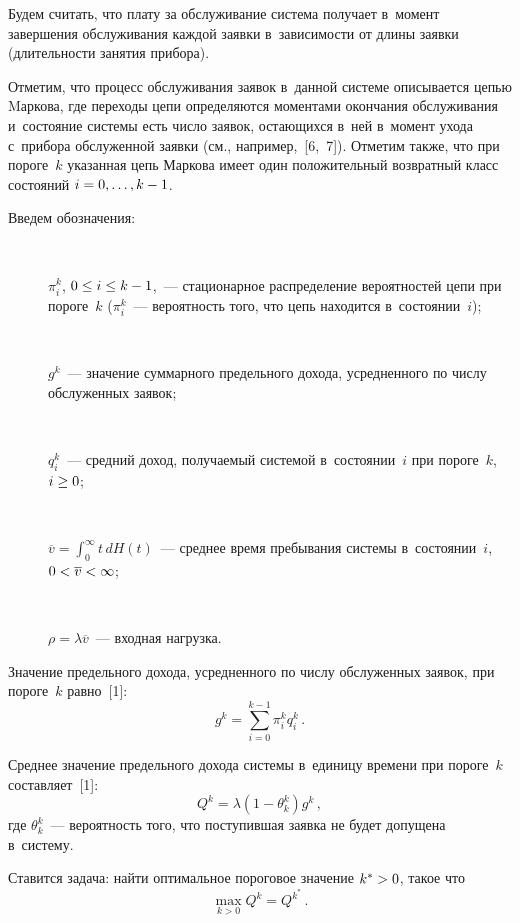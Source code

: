 \begin{multicols}{2}
  Будем считать, что плату за обслуживание сис\-те\-ма получает в~момент 
завершения обслуживания каждой заявки в~зависимости от длины заявки 
(длительности занятия прибора).
  
  Отметим, что процесс обслуживания заявок в~данной системе описывается 
цепью Mаркова, где переходы цепи определяются моментами окончания 
обслуживания и~состояние системы есть число заявок, остающихся в~ней 
в~момент ухода с~прибора обслуженной заявки (см., например,~[6,~7]). 
Отметим также, что при пороге~$k$ указанная цепь Маркова имеет один 
положительный возвратный класс состояний $i\hm=0,\ldots, k-1$.
  
  Введем обозначения:
  \begin{description}
  \item[\,] $\pi_i^k$, $0\leq i\hm\leq k\hm-1$,~--- стационарное распределение 
вероятностей цепи при пороге~$k$ ($\pi_i^k$~--- вероятность того, что цепь 
находится в~состоянии~$i$);
  \item[\,] $g^k$~--- значение суммарного предельного дохода, усредненного по 
числу обслуженных заявок;
\item[\,] $q_i^k$~--- средний доход, получаемый системой в~состоянии~$i$ при 
пороге~$k$, $i\hm\geq 0$;
\item[\,] $\overline{v}=\int\nolimits_0^\infty t\,dH(t)$~--- среднее время 
пребывания сис\-те\-мы в~состоянии~$i$, $0\hm <\overline{v}\hm<\infty$;
\item[\,] $\rho=\lambda\overline{v}$~--- входная нагрузка.
\end{description}
  
  Значение предельного дохода, усредненного по числу обслуженных заявок, 
при пороге~$k$ равно~[1]:
  \begin{equation}
  g^k=\sum\limits_{i=0}^{k-1} \pi^k_i q_i^k\,.
  \label{e1-ag}
  \end{equation}
  
  Среднее значение предельного дохода системы в~единицу времени при 
пороге~$k$ составляет~[1]: 
  \begin{equation}
  Q^k = \lambda\left(1-\theta_k^k\right) g^k\,,
  \label{e2-ag}
  \end{equation}
где $\theta_k^k$~--- вероятность того, что поступившая заявка не
будет допущена в~систему. 

  Ставится задача: найти оптимальное пороговое значение $k^*\hm>0$, такое 
что 
  \begin{equation}
  \max\limits_{k>0} Q^k=Q^{k^*}\,.
  \label{e3-ag}
  \end{equation}
  

\end{multicols}
